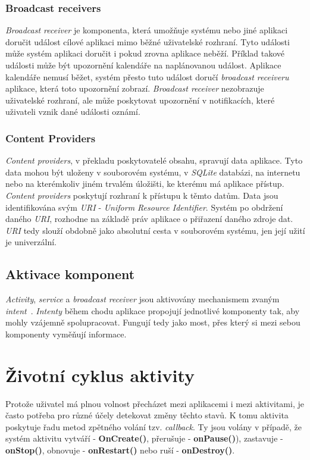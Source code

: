         \subsubsection{Broadcast receivers}
        \emph{Broadcast receiver} je komponenta, která umožňuje systému nebo jiné aplikaci doručit událost cílové aplikaci mimo běžné uživatelské rozhraní. Tyto události může systém aplikaci doručit i pokud zrovna aplikace neběží. Příklad takové události může být upozornění kalendáře na naplánovanou událost. Aplikace kalendáře nemusí běžet, systém přesto tuto událost doručí \emph{broadcast receiveru} aplikace, která toto upozornění zobrazí. \emph{Broadcast receiver} nezobrazuje uživatelské rozhraní, ale může poskytovat upozornění v notifikacích, které uživateli vznik dané události oznámí.

        \subsubsection{Content Providers}
        \emph{Content providers}, v překladu poskytovatelé obsahu, spravují data aplikace. Tyto data mohou být uloženy v souborovém systému, v \emph{SQLite} databázi, na internetu nebo na kterémkoliv jiném trvalém úložišti, ke kterému má aplikace přístup. \emph{Content providers} poskytují rozhraní k přístupu k těmto datům. Data jsou identifikována svým \emph{URI} - \emph{Uniform Resource Identifier}. Systém po obdržení daného \emph{URI}, rozhodne na základě práv aplikace o přiřazení daného zdroje dat. \emph{URI} tedy slouží obdobně jako absolutní cesta v souborovém systému, jen její užití je univerzální.

    \subsection{Aktivace komponent}
    \emph{Activity}, \emph{service} a \emph{broadcast receiver} jsou aktivovány mechanismem zvaným \emph{intent}~. \emph{Intenty} během chodu aplikace propojují jednotlivé komponenty tak, aby mohly vzájemně spolupracovat. Fungují tedy jako most, přes který si mezi sebou komponenty vyměňují informace.

\newpage
\section{Životní cyklus aktivity}
Protože uživatel má plnou volnost přecházet mezi aplikacemi i mezi aktivitami, je často potřeba pro různé účely detekovat změny těchto stavů. K tomu aktivita poskytuje řadu metod zpětného volání tzv. \emph{callback}. Ty jsou volány v případě, že systém aktivitu vytváří - \textbf{OnCreate()}, přerušuje - \textbf{onPause()}), zastavuje - \textbf{onStop()}, obnovuje - \textbf{onRestart()} nebo ruší - \textbf{onDestroy()}.

